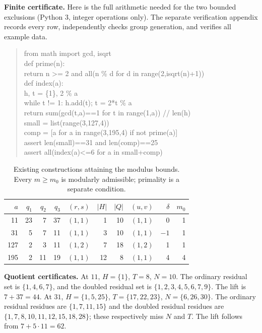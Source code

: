 \documentclass[11pt,a4paper]{article}
\theoremstyle{definition}\newtheorem{definition}[theorem]{Definition}
\begin{document}
\noindent\textbf{Finite certificate.}
Here is the full arithmetic needed for the two bounded exclusions (Python 3, integer operations only). The separate verification appendix records every row, independently checks group generation, and verifies all example data.
\begin{samepage}
\begin{quote}\small\ttfamily
from math import gcd, isqrt\\
def prime(n):\\
\hspace*{1em}return n >= 2 and all(n \% d for d in range(2,isqrt(n)+1))\\
def index(a):\\
\hspace*{1em}h, t = \{1\}, 2 \% a\\
\hspace*{1em}while t != 1: h.add(t); t = 2*t \% a\\
\hspace*{1em}return sum(gcd(t,a)==1 for t in range(1,a)) // len(h)\\
small = list(range(3,127,4))\\
comp = [a for a in range(3,195,4) if not prime(a)]\\
assert len(small)==31 and len(comp)==25\\
assert all(index(a)<=6 for a in small+comp)
\end{quote}
\end{samepage}

\begin{table}[ht]
\centering\small
\begin{tabular}{@{}rrrrrrrrrr@{}}\toprule
$a$&$q_1$&$q_2$&$q_3$&$(r,s)$&$|H|$&$|Q|$&$(u,v)$&$\delta$&$m_0$\\\midrule
11&23&7&37&$(1,1)$&1&10&$(1,1)$&0&1\\
31&5&7&11&$(1,1)$&3&10&$(1,1)$&$-1$&1\\
127&2&3&11&$(1,2)$&7&18&$(1,2)$&1&1\\
195&2&11&19&$(1,1)$&12&8&$(1,1)$&4&4\\\bottomrule
\end{tabular}
\caption{Existing constructions attaining the modulus bounds. Every $m\ge m_0$ is modularly admissible; primality is a separate condition.}\label{witnesses}
\end{table}

\noindent\textbf{Quotient certificates.}
At $11$, $H=\{1\}$, $T=8$, $N=10$. The ordinary residual set is $\{1,4,6,7\}$, and the doubled residual set is $\{1,2,3,4,5,6,7,9\}$. The lift is $7+37=44$.
At $31$, $H=\{1,5,25\}$, $T=\{17,22,23\}$, $N=\{6,26,30\}$. The ordinary residual residues are $\{1,7,11,15\}$ and the doubled residual residues are $\{1,7,8,10,11,12,15,18,28\}$; these respectively miss $N$ and $T$. The lift follows from $7+5\cdot11=62$.
\end{document}
